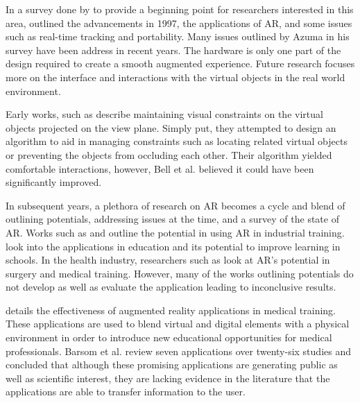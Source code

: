 In a survey done by \cite{Azuma1997} to provide a beginning point for researchers interested in this area, outlined the advancements in 1997, the applications of AR, and some issues such as real-time tracking and portability. Many issues outlined by Azuma in his survey have been address in recent years. The hardware is only one part of the design required to create a smooth augmented experience. Future research focuses more on the interface and interactions with the virtual objects in the real world environment.

Early works, such as \cite{Bell2001} describe maintaining visual constraints on the virtual objects projected on the view plane. Simply put, they attempted to design an algorithm to aid in managing constraints such as locating related virtual objects or preventing the objects from occluding each other. Their algorithm yielded comfortable interactions, however, Bell et al. believed it could have been significantly improved. 

In subsequent years, a plethora of research on AR becomes a cycle and blend of outlining potentials, addressing issues at the time, and a survey of the state of AR. Works such as \cite{Zhong2003} and \cite{Boulanger2004} outline the potential in using AR in industrial training. \cite{Bower2014} look into the applications in education and its potential to improve learning in schools. In the health industry, researchers such as \cite{Barsom2016, Chan2017, Chen2015, Okamoto2015} look at AR's potential in surgery and medical training. However, many of the works outlining potentials do not develop as well as evaluate the application leading to inconclusive results.

\cite{Barsom2016} details the effectiveness of augmented reality applications in medical training. These applications are used to blend virtual and digital elements with a physical environment in order to introduce new educational opportunities for medical professionals. Barsom et al. review seven applications over twenty-six studies and concluded that although these promising applications are generating public as well as scientific interest, they are lacking evidence in the literature that the applications are able to transfer information to the user.

